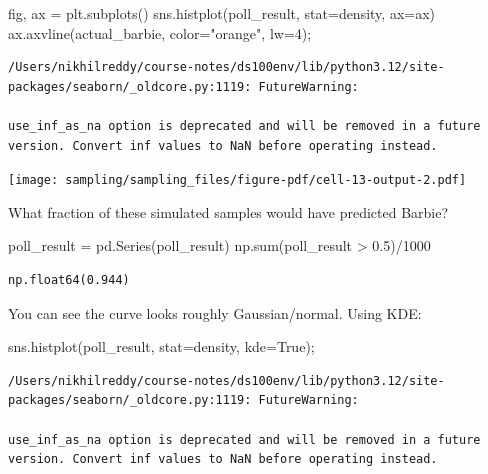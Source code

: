 \documentclass[
  letterpaper,
  DIV=11,
  numbers=noendperiod]{scrreprt}
\newenvironment{Shaded}{\begin{snugshade}}{\end{snugshade}}
\newcommand{\BuiltInTok}[1]{\textcolor[rgb]{0.00,0.23,0.31}{#1}}
\newcommand{\DecValTok}[1]{\textcolor[rgb]{0.68,0.00,0.00}{#1}}
\newcommand{\FloatTok}[1]{\textcolor[rgb]{0.68,0.00,0.00}{#1}}
\newcommand{\NormalTok}[1]{\textcolor[rgb]{0.00,0.23,0.31}{#1}}
\newcommand{\OperatorTok}[1]{\textcolor[rgb]{0.37,0.37,0.37}{#1}}
\newcommand{\StringTok}[1]{\textcolor[rgb]{0.13,0.47,0.30}{#1}}
\newcommand{\VariableTok}[1]{\textcolor[rgb]{0.07,0.07,0.07}{#1}}
\begin{document}
\begin{Shaded}
\begin{Highlighting}[]
\NormalTok{fig, ax }\OperatorTok{=}\NormalTok{ plt.subplots()}
\NormalTok{sns.histplot(poll\_result, stat}\OperatorTok{=}\StringTok{\textquotesingle{}density\textquotesingle{}}\NormalTok{, ax}\OperatorTok{=}\NormalTok{ax)}
\NormalTok{ax.axvline(actual\_barbie, color}\OperatorTok{=}\StringTok{"orange"}\NormalTok{, lw}\OperatorTok{=}\DecValTok{4}\NormalTok{)}\OperatorTok{;}
\end{Highlighting}
\end{Shaded}

\begin{verbatim}
/Users/nikhilreddy/course-notes/ds100env/lib/python3.12/site-packages/seaborn/_oldcore.py:1119: FutureWarning:

use_inf_as_na option is deprecated and will be removed in a future version. Convert inf values to NaN before operating instead.
\end{verbatim}

\texttt{[image: sampling/sampling\_files/figure-pdf/cell-13-output-2.pdf]}

What fraction of these simulated samples would have predicted Barbie?

\begin{Shaded}
\begin{Highlighting}[]
\NormalTok{poll\_result }\OperatorTok{=}\NormalTok{ pd.Series(poll\_result)}
\NormalTok{np.}\BuiltInTok{sum}\NormalTok{(poll\_result }\OperatorTok{\textgreater{}} \FloatTok{0.5}\NormalTok{)}\OperatorTok{/}\DecValTok{1000}
\end{Highlighting}
\end{Shaded}

\begin{verbatim}
np.float64(0.944)
\end{verbatim}

You can see the curve looks roughly Gaussian/normal. Using KDE:

\begin{Shaded}
\begin{Highlighting}[]
\NormalTok{sns.histplot(poll\_result, stat}\OperatorTok{=}\StringTok{\textquotesingle{}density\textquotesingle{}}\NormalTok{, kde}\OperatorTok{=}\VariableTok{True}\NormalTok{)}\OperatorTok{;}
\end{Highlighting}
\end{Shaded}

\begin{verbatim}
/Users/nikhilreddy/course-notes/ds100env/lib/python3.12/site-packages/seaborn/_oldcore.py:1119: FutureWarning:

use_inf_as_na option is deprecated and will be removed in a future version. Convert inf values to NaN before operating instead.
\end{verbatim}
\end{document}

